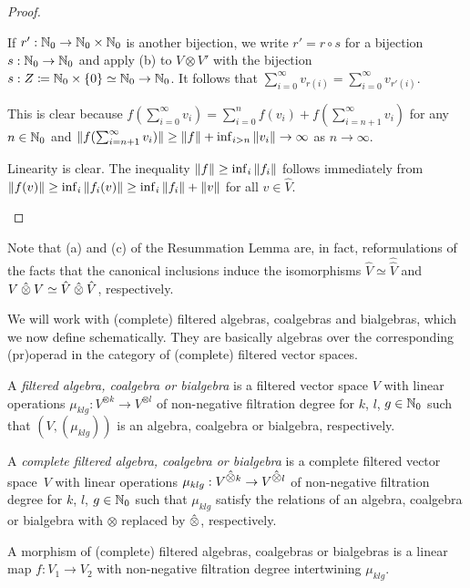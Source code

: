 \documentclass[\MainFolder/Text.tex]{subfiles}
\begin{document}
\begin{proof}
\begin{ProofList}
If $r': \mathbb{N}_0 \rightarrow \mathbb{N}_0\times\mathbb{N}_0$ is another bijection, we write $r' = r \circ s$ for a bijection $s: \mathbb{N}_0 \rightarrow \mathbb{N}_0$ and apply (b) to $V\otimes V'$ with the bijection $s: Z\coloneqq \mathbb{N}_0 \times\{0\}\simeq \mathbb{N}_0\rightarrow \mathbb{N}_0$. It follows that $\sum_{i=0}^\infty v_{r(i)} = \sum_{i=0}^\infty v_{r'(i)}$.
\item This is clear because $f(\sum_{i=0}^\infty v_i) = \sum_{i=0}^n f(v_i) + f(\sum_{i=n+1}^\infty v_i)$ for any $n\in \mathbb{N}_0$ and $\| f(\sum_{i=n+1}^\infty v_i) \| \ge \| f \| + \inf_{i>n}\| v_i \| \to \infty$ as $n\to\infty$.
\item Linearity is clear. The inequality $\| f \|\ge \inf_i\| f_i \|$ follows immediately from $\| f(v) \| \ge \inf_i \| f_i(v) \| \ge \inf_i \| f_i \| + \| v \|$ for all $v\in \hat{V}$.\qedhere
\end{ProofList}
\end{proof}

Note that (a) and (c) of the Resummation Lemma are, in fact, reformulations of the facts that the canonical inclusions induce the isomorphisms $\hat{V}\simeq\hat{\hat{V}}$ and $V\COtimes V\simeq\hat{V}\COtimes \hat{V}$, respectively.

We will work with (complete) filtered algebras, coalgebras and bialgebras, which we now define schematically. They are basically algebras over the corresponding (pr)operad in the category of (complete) filtered vector spaces. 

\begin{Definition}\label{Def:FiltAlg}
A \emph{filtered algebra, coalgebra or bialgebra} is a filtered vector space $V$ with linear operations $\mu_{klg}: V^{\otimes k} \rightarrow V^{\otimes l}$  of non-negative filtration degree for $k$, $l$, $g\in \mathbb{N}_0$ such that $(V,(\mu_{klg}))$ is an algebra, coalgebra or bialgebra, respectively.

A \emph{complete filtered algebra, coalgebra or bialgebra} is a complete filtered vector space~$V$ with linear operations $\mu_{klg}: V^{\COtimes k} \rightarrow V^{\COtimes l}$ of non-negative filtration degree for $k$, $l$, $g\in \mathbb{N}_0$ such that $\mu_{klg}$ satisfy the relations of an algebra, coalgebra or bialgebra with $\otimes$ replaced by $\COtimes$, respectively.

A morphism of (complete) filtered algebras, coalgebras or bialgebras is a linear map $f:V_1 \rightarrow V_2$ with non-negative filtration degree intertwining $\mu_{klg}$.
\end{Definition}
\end{document}
